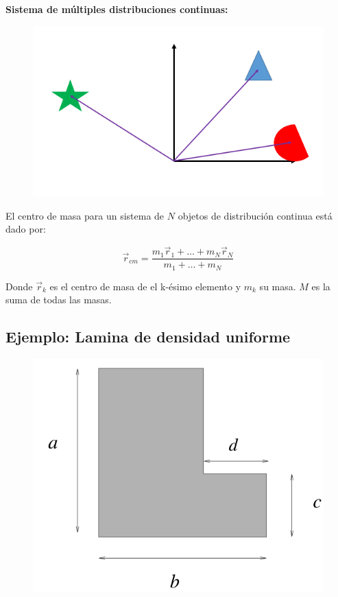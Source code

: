 \documentclass[a4paper,11pt]{article}
\begin{document}
\textbf{Sistema de múltiples distribuciones continuas:}\\



\begin{figure}
	\includegraphics[scale=0.5]{./im/muchos3d}
\end{figure}

El centro de masa para un sistema de $N$ objetos de distribución continua está dado por:

\begin{equation}
 \vec{r}_{cm} = \frac{m_1\vec{r}_1 + \dots + m_N \vec{r}_N}{m_1 + \dots + m_N}
\end{equation}



Donde $ \vec{r}_k$ es el centro de masa de el k-ésimo elemento y $m_k$ su masa. $M$ es la suma de todas las masas.


\subsection{Ejemplo: Lamina de densidad uniforme} 


\begin{figure}
	\includegraphics[scale=0.5]{./im/4}
\end{figure}
\end{document}
